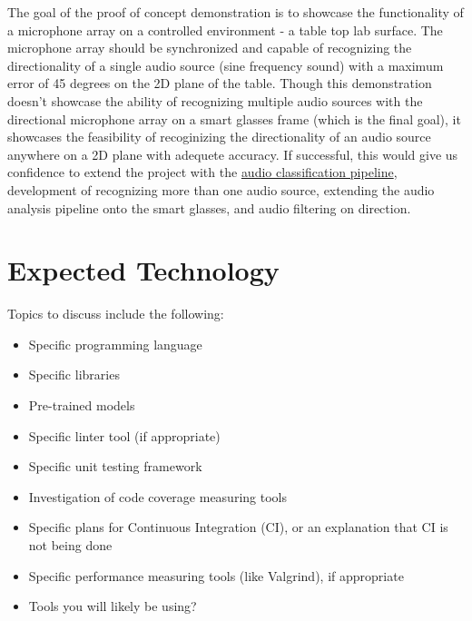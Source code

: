 \documentclass{article}
\begin{document}
The goal of the proof of concept demonstration is to showcase the functionality of a microphone array on a controlled environment - a table top lab surface.
The microphone array should be synchronized and capable of recognizing the directionality of a single audio source (sine frequency sound) with a maximum error of 45 degrees on the 2D plane of the table.
Though this demonstration doesn't showcase the ability of recognizing multiple audio sources with the directional microphone array on a smart glasses frame (which is the final goal), it showcases the feasibility of recoginizing the directionality of an audio source anywhere on a 2D plane with adequete accuracy.
If successful, this would give us confidence to extend the project with the \hyperlink{audio_classification_pipeline}{audio classification pipeline}, development of recognizing more than one audio source, extending the audio analysis pipeline onto the smart glasses, and audio filtering on direction. 

\section{Expected Technology}



Topics to discuss include the following:

\begin{itemize}
\item Specific programming language
\item Specific libraries
\item Pre-trained models
\item Specific linter tool (if appropriate)
\item Specific unit testing framework
\item Investigation of code coverage measuring tools
\item Specific plans for Continuous Integration (CI), or an explanation that CI
  is not being done
\item Specific performance measuring tools (like Valgrind), if
  appropriate
\item Tools you will likely be using?
\end{itemize}
\end{document}
